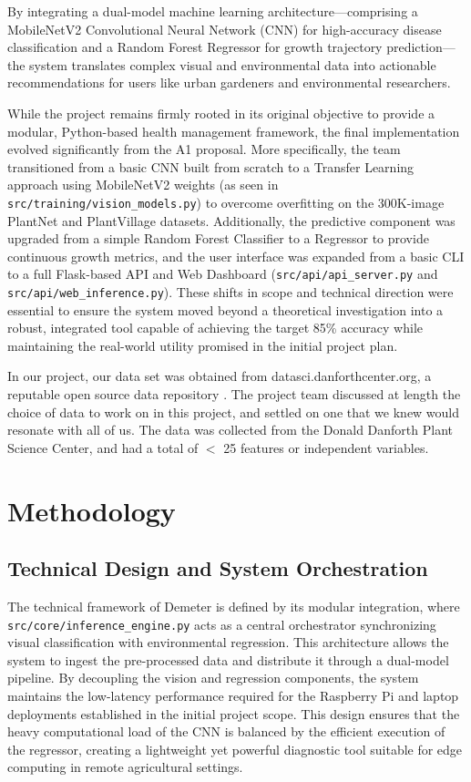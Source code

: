 \documentclass[11pt,a4paper]{article}
\begin{document}
\noindent By integrating a dual-model machine learning architecture—comprising a MobileNetV2 Convolutional Neural Network (CNN) for high-accuracy disease classification and a Random Forest Regressor for growth trajectory prediction—the system translates complex visual and environmental data into actionable recommendations for users like urban gardeners and environmental researchers.

\noindent While the project remains firmly rooted in its original objective to provide a modular, Python-based health management framework, the final implementation evolved significantly from the A1 proposal. More specifically, the team transitioned from a basic CNN built from scratch to a Transfer Learning approach using MobileNetV2 weights (as seen in \texttt{src/training/vision\_models.py}) to overcome overfitting on the 300K-image PlantNet and PlantVillage datasets. Additionally, the predictive component was upgraded from a simple Random Forest Classifier to a Regressor to provide continuous growth metrics, and the user interface was expanded from a basic CLI to a full Flask-based API and Web Dashboard (\texttt{src/api/api\_server.py} and \texttt{src/api/web\_inference.py}). These shifts in scope and technical direction were essential to ensure the system moved beyond a theoretical investigation into a robust, integrated tool capable of achieving the target 85\% accuracy while maintaining the real-world utility promised in the initial project plan.

\noindent In our project, our data set was obtained from \textsf{datasci.danforthcenter.org}, a reputable open source data repository \cite{danforth2018}. The project team discussed at length the choice of data to work on in this project, and settled on one that we knew would resonate with all of us. The data was collected from the Donald Danforth Plant Science Center, and had a total of $<$ 25 features or independent variables.
	
\section{Methodology}\label{sec:meth}
	
\subsection{Technical Design and System Orchestration}
The technical framework of Demeter is defined by its modular integration, where \texttt{src/core/inference\_engine.py} acts as a central orchestrator synchronizing visual classification with environmental regression. This architecture allows the system to ingest the pre-processed data and distribute it through a dual-model pipeline. By decoupling the vision and regression components, the system maintains the low-latency performance required for the Raspberry Pi and laptop deployments established in the initial project scope. This design ensures that the heavy computational load of the CNN is balanced by the efficient execution of the regressor, creating a lightweight yet powerful diagnostic tool suitable for edge computing in remote agricultural settings.
	
\end{document}
